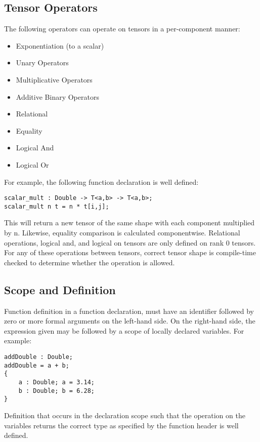 \subsection{Tensor Operators}
The following operators can operate on tensors in a per-component manner:
\begin{itemize}
    \item Exponentiation (to a scalar)
    \item Unary Operators
    \item Multiplicative Operators
    \item Additive Binary Operators
    \item Relational 
    \item Equality
    \item Logical And
    \item Logical Or
\end{itemize}
For example, the following function declaration is well defined:
\begin{lstlisting}
scalar_mult : Double -> T<a,b> -> T<a,b>;
scalar_mult n t = n * t[i,j];
\end{lstlisting}
This will return a new tensor of the same shape with each component multiplied
by n. Likewise, equality comparison is calculated componentwise. Relational
operations, logical and, and logical on tensors are only defined on rank
0 tensors.
\\
For any of these operations between tensors, correct tensor shape is
compile-time checked to determine whether the operation is allowed.

\subsection{Scope and Definition}
Function definition in a function declaration, must have an
identifier followed by zero or more formal arguments on the left-hand side. On
the right-hand side, the expression given may be followed by a scope of locally
declared variables. For example:
\begin{lstlisting}
addDouble : Double; 
addDouble = a + b; 
{ 
    a : Double; a = 3.14;
    b : Double; b = 6.28;
}
\end{lstlisting}
Definition that occurs in the declaration scope such that the operation 
on the variables returns the correct type as specified by the function header
is well defined.
